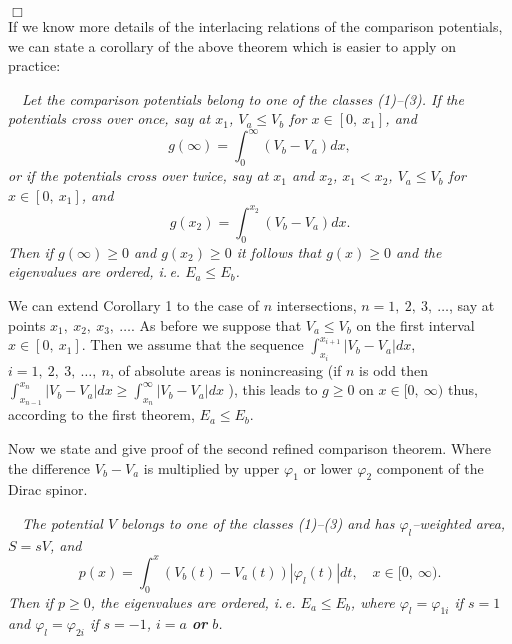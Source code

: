 \documentclass[amsmath,amssymb,superscriptaddress,showkeys, showpacs, aps, nofootinbib]{revtex4}
\begin{document}
\hfill $\Box$\\

If we know more details of the interlacing relations of the comparison potentials, we can state a corollary of the above theorem which is easier to apply on practice:

\medskip

 ~~{\it Let the comparison potentials belong to one of the classes (1)--(3). If the potentials cross over once, say at $x_1$, $V_a\le V_b$ for $x\in [0,\ x_1]$, and
\begin{equation*}
g(\infty)=\int_0^\infty (V_b-V_a)dx,  
\end{equation*}
or if the potentials cross over twice, say at $x_1$ and $x_2$, $x_1<x_2$, $V_a\le V_b$ for $x\in [0,\ x_1]$, and
\begin{equation*}
g(x_2)=\int_0^{x_2} (V_b-V_a) dx. 
\end{equation*}
Then if $g(\infty)\ge 0$ and $g(x_2)\ge 0$ it follows that $g(x)\ge 0$ and the eigenvalues are ordered, i.\,e. $E_a\le E_b$.} 

\medskip

We can extend Corollary 1 to the case of $n$ intersections, $n=1,\ 2,\ 3,\ \ldots$, say at points $x_1,\ x_2,\ x_3,\ \ldots$. As before we suppose that $V_a\le V_b$ on the first interval $x\in[0,\ x_1]$. Then we assume that the sequence $\int_{x_i}^{x_{i+1}}|V_b-V_a|dx$, $i=1,\ 2,\ 3,\ \ldots,\ n$, of absolute areas is nonincreasing (if $n$ is odd then $\int_{x_{n-1}}^{x_n}|V_b-V_a|dx\ge\int_{x_n}^\infty|V_b-V_a|dx$ ), this leads to $g\ge 0$ on  $x\in[0,\ \infty)$ thus, according to the first theorem, $E_a\le E_b$. 

Now we state and give proof of the second refined comparison theorem. Where the difference $V_b-V_a$ is multiplied by upper $\varphi_1$ or lower $\varphi_2$ component of the Dirac spinor.  

\medskip

 ~~{\it The potential $V$  belongs to one of the classes (1)--(3) and has $\varphi_l$--weighted area, $S=sV$, and 
\begin{equation}\label{th4}
p(x)=\int_0^x (V_b(t)-V_a(t))|\varphi_{l}(t)|dt, \quad x\in [0,\ \infty).
\end{equation}
Then if $p\ge 0$, the eigenvalues are ordered, i.\,e. $E_a\le E_b$, where $\varphi_l=\varphi_{1i}$ if $s=1$ and $\varphi_l=\varphi_{2i}$ if $s=-1$, $i=a$ {\bf or} $b$.} 

\medskip
\end{document}
